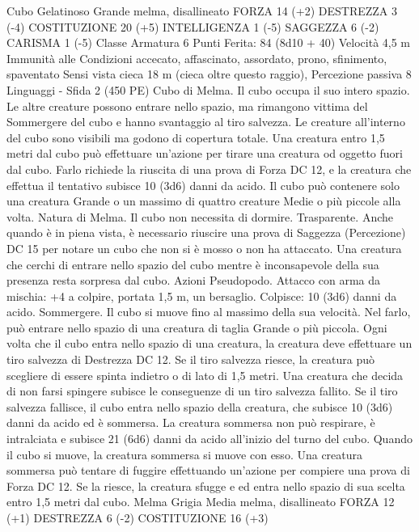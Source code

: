 \begin{multicols}{2}
Cubo Gelatinoso
Grande melma, disallineato
FORZA 14 (+2)
DESTREZZA 3 (-4)
COSTITUZIONE 20 (+5)
INTELLIGENZA 1 (-5)
SAGGEZZA 6 (-2)
CARISMA 1 (-5)
Classe Armatura 6
\hspace*{0pt}\hfill{Punti Ferita}: 84 (8d10 + 40)
Velocità 4,5 m
Immunità alle Condizioni accecato, affascinato, assordato,
prono, sfinimento, spaventato
Sensi vista cieca 18 m (cieca oltre questo raggio), Percezione
passiva 8
Linguaggi -
Sfida 2 (450 PE)
Cubo di Melma. Il cubo occupa il suo intero spazio. Le altre
creature possono entrare nello spazio, ma rimangono vittima del
Sommergere del cubo e hanno svantaggio al tiro salvezza.
Le creature all’interno del cubo sono visibili ma godono di
copertura totale.
Una creatura entro 1,5 metri dal cubo può effettuare un’azione
per tirare una creatura od oggetto fuori dal cubo. Farlo richiede la
riuscita di una prova di Forza DC 12, e la creatura che effettua il
tentativo subisce 10 (3d6) danni da acido.
Il cubo può contenere solo una creatura Grande o un massimo di
quattro creature Medie o più piccole alla volta.
Natura di Melma. Il cubo non necessita di dormire.
Trasparente. Anche quando è in piena vista, è necessario riuscire
una prova di Saggezza (Percezione) DC 15 per notare un cubo
che non si è mosso o non ha attaccato. Una creatura che cerchi di
entrare nello spazio del cubo mentre è inconsapevole della sua
presenza resta sorpresa dal cubo.
Azioni
Pseudopodo. Attacco con arma da mischia: +4 a colpire, portata
1,5 m, un bersaglio.
Colpisce: 10 (3d6) danni da acido.
Sommergere. Il cubo si muove fino al massimo della sua velocità.
Nel farlo, può entrare nello spazio di una creatura di taglia Grande o
più piccola. Ogni volta che il cubo entra nello spazio di una creatura,
la creatura deve effettuare un tiro salvezza di Destrezza DC 12.
Se il tiro salvezza riesce, la creatura può scegliere di essere spinta
indietro o di lato di 1,5 metri. Una creatura che decida di non farsi
spingere subisce le conseguenze di un tiro salvezza fallito.
Se il tiro salvezza fallisce, il cubo entra nello spazio della creatura,
che subisce 10 (3d6) danni da acido ed è sommersa. La creatura
sommersa non può respirare, è intralciata e subisce 21 (6d6) danni da
acido all’inizio del turno del cubo. Quando il cubo si muove, la
creatura sommersa si muove con esso.
Una creatura sommersa può tentare di fuggire effettuando un’azione
per compiere una prova di Forza DC 12. Se la riesce, la creatura
sfugge e ed entra nello spazio di sua scelta entro 1,5 metri dal cubo.
Melma Grigia
Media melma, disallineato
FORZA 12 (+1)
DESTREZZA 6 (-2)
COSTITUZIONE 16 (+3)

\end{multicols}
